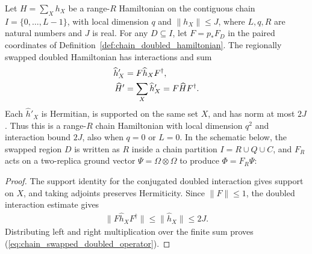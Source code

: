 \begin{definition}
    \label{def:chain_swapped_doubled_hamiltonian}
    \leanok
    Let $H=\sum_Xh_X$ be a range-$R$ Hamiltonian on the contiguous chain
    $I=\{0,\ldots,L-1\}$, with local dimension $q$ and
    $\|h_X\|\le J$, where $L,q,R$ are natural numbers and $J$ is real.
    For any $D\subseteq I$, let $F=p_*F_D$ in the paired coordinates of
    Definition~\ref{def:chain_doubled_hamiltonian}. The regionally swapped
    doubled Hamiltonian has interactions and sum
    \begin{align}
        \widehat h'_X & =F\widehat h_XF^\dagger,\notag              \\
        \widehat H'   & =\sum_X\widehat h'_X=F\widehat H F^\dagger.
        \label{eq:chain_swapped_doubled_operator}
    \end{align}
    Each $\widehat h'_X$ is Hermitian, is supported on the same set $X$,
    and has norm at most $2J$. Thus this is a range-$R$ chain Hamiltonian
    with local dimension $q^2$ and interaction bound $2J$, also when
    $q=0$ or $L=0$.
    In the schematic below, the swapped region $D$ is written as $R$ inside
    a chain partition $I=R\cup Q\cup C$, and $F_R$ acts on a two-replica
    ground vector $\Psi=\Omega\otimes\Omega$ to produce $\Phi=F_R\Psi$:
    
\end{definition}
\begin{proof}
    \leanok
    The support identity for the conjugated doubled interaction gives
    support on $X$, and taking adjoints preserves Hermiticity.
    Since $\|F\|\le1$, the doubled interaction estimate gives
    \begin{align}
        \|F\widehat h_XF^\dagger\|
        \le\|\widehat h_X\|\le2J.
    \end{align}
    Distributing left and right multiplication over the finite sum proves
    (\ref{eq:chain_swapped_doubled_operator}).
\end{proof}

